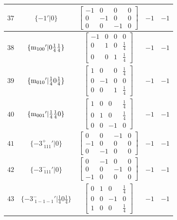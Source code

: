\documentclass[fleqn,8pt]{jsarticle}
\begin{document}
\begin{longtable}{ccccc}
$ 37 $ & $ \{-1{}'|0\} $ & $ \begin{bmatrix} -1 & 0 & 0 & 0 \\ 0 & -1 & 0 & 0 \\ 0 & 0 & -1 & 0 \end{bmatrix} $ & $ -1 $ & $ -1 $ \\ \hline
$ 38 $ & $ \{{\rm m}_{100}{}'|0 \frac{1}{4} \frac{1}{4}\} $ & $ \begin{bmatrix} -1 & 0 & 0 & 0 \\ 0 & 1 & 0 & \frac{1}{4} \\ 0 & 0 & 1 & \frac{1}{4} \end{bmatrix} $ & $ -1 $ & $ -1 $ \\ \hline
$ 39 $ & $ \{{\rm m}_{010}{}'|\frac{1}{4} 0 \frac{1}{4}\} $ & $ \begin{bmatrix} 1 & 0 & 0 & \frac{1}{4} \\ 0 & -1 & 0 & 0 \\ 0 & 0 & 1 & \frac{1}{4} \end{bmatrix} $ & $ -1 $ & $ -1 $ \\ \hline
$ 40 $ & $ \{{\rm m}_{001}{}'|\frac{1}{4} \frac{1}{4} 0\} $ & $ \begin{bmatrix} 1 & 0 & 0 & \frac{1}{4} \\ 0 & 1 & 0 & \frac{1}{4} \\ 0 & 0 & -1 & 0 \end{bmatrix} $ & $ -1 $ & $ -1 $ \\ \hline
$ 41 $ & $ \{-3^{+}_{\,\,111}{}'|0\} $ & $ \begin{bmatrix} 0 & 0 & -1 & 0 \\ -1 & 0 & 0 & 0 \\ 0 & -1 & 0 & 0 \end{bmatrix} $ & $ -1 $ & $ -1 $ \\ \hline
$ 42 $ & $ \{-3^{-}_{\,\,111}{}'|0\} $ & $ \begin{bmatrix} 0 & -1 & 0 & 0 \\ 0 & 0 & -1 & 0 \\ -1 & 0 & 0 & 0 \end{bmatrix} $ & $ -1 $ & $ -1 $ \\ \hline
$ 43 $ & $ \{-3^{-}_{\,\,1-1-1}{}'|\frac{1}{4} 0 \frac{1}{4}\} $ & $ \begin{bmatrix} 0 & 1 & 0 & \frac{1}{4} \\ 0 & 0 & -1 & 0 \\ 1 & 0 & 0 & \frac{1}{4} \end{bmatrix} $ & $ -1 $ & $ -1 $ \\ \hline

\end{longtable}
\end{document}
